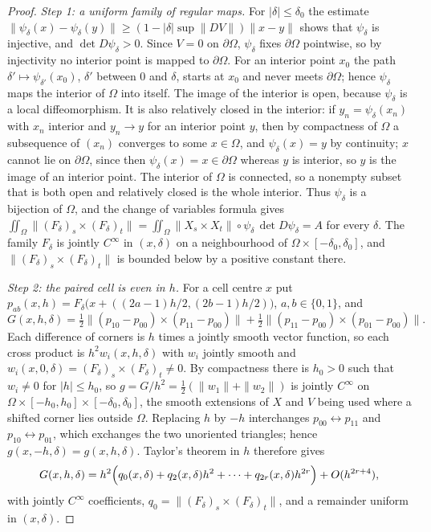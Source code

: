 \documentclass[11pt]{article}
\theoremstyle{remark}
\begin{document}
\begin{proof}
\emph{Step 1: a uniform family of regular maps.} For $|\delta|\le\delta_0$ the estimate
$\|\psi_\delta(x)-\psi_\delta(y)\|\ge(1-|\delta|\sup\|DV\|)\|x-y\|$ shows that $\psi_\delta$
is injective, and $\det D\psi_\delta>0$. Since $V=0$ on $\partial\Omega$, $\psi_\delta$ fixes
$\partial\Omega$ pointwise, so by injectivity no interior point is mapped to $\partial\Omega$.
For an interior point $x_0$ the path $\delta'\mapsto\psi_{\delta'}(x_0)$, $\delta'$ between $0$
and $\delta$, starts at $x_0$ and never meets $\partial\Omega$; hence $\psi_\delta$ maps the
interior of $\Omega$ into itself. The image of the interior is open, because $\psi_\delta$ is a local diffeomorphism. It is
also relatively closed in the interior: if $y_n=\psi_\delta(x_n)$ with $x_n$ interior and
$y_n\to y$ for an interior point $y$, then by compactness of $\Omega$ a subsequence of $(x_n)$
converges to some $x\in\Omega$, and $\psi_\delta(x)=y$ by continuity; $x$ cannot lie on
$\partial\Omega$, since then $\psi_\delta(x)=x\in\partial\Omega$ whereas $y$ is interior, so $y$
is the image of an interior point. The interior of $\Omega$ is connected, so a nonempty subset
that is both open and relatively closed is the whole interior. Thus
$\psi_\delta$ is a bijection of $\Omega$, and the change of variables formula gives
$\iint_\Omega\|(F_\delta)_s\times(F_\delta)_t\|=\iint_\Omega\|X_s\times X_t\|\circ\psi_\delta\,
\det D\psi_\delta=A$ for every $\delta$. The family $F_\delta$ is jointly $C^\infty$ in
$(x,\delta)$ on a neighbourhood of $\Omega\times[-\delta_0,\delta_0]$, and
$\|(F_\delta)_s\times(F_\delta)_t\|$ is bounded below by a positive constant there.

\emph{Step 2: the paired cell is even in $h$.} For a cell centre $x$ put
$p_{ab}(x,h)=F_\delta\bigl(x+((2a-1)h/2,(2b-1)h/2)\bigr)$, $a,b\in\{0,1\}$, and
\[
G(x,h,\delta)=\tfrac12\|(p_{10}-p_{00})\times(p_{11}-p_{00})\|
+\tfrac12\|(p_{11}-p_{00})\times(p_{01}-p_{00})\| .
\]
Each difference of corners is $h$ times a jointly smooth vector function, so each cross
product is $h^2w_i(x,h,\delta)$ with $w_i$ jointly smooth and
$w_i(x,0,\delta)=(F_\delta)_s\times(F_\delta)_t\neq0$. By compactness there is $h_0>0$ such
that $w_i\neq0$ for $|h|\le h_0$, so $g=G/h^2=\tfrac12(\|w_1\|+\|w_2\|)$ is jointly
$C^\infty$ on $\Omega\times[-h_0,h_0]\times[-\delta_0,\delta_0]$, the smooth extensions of
$X$ and $V$ being used where a shifted corner lies outside $\Omega$. Replacing $h$ by $-h$
interchanges $p_{00}\leftrightarrow p_{11}$ and $p_{10}\leftrightarrow p_{01}$, which
exchanges the two unoriented triangles; hence $g(x,-h,\delta)=g(x,h,\delta)$. Taylor's
theorem in $h$ therefore gives
\[
G(x,h,\delta)=h^2\Bigl(q_0(x,\delta)+q_2(x,\delta)h^2+\dots+q_{2r}(x,\delta)h^{2r}\Bigr)
+O(h^{2r+4}),
\]
with jointly $C^\infty$ coefficients, $q_0=\|(F_\delta)_s\times(F_\delta)_t\|$, and a remainder
uniform in $(x,\delta)$.


\end{proof}
\end{document}
